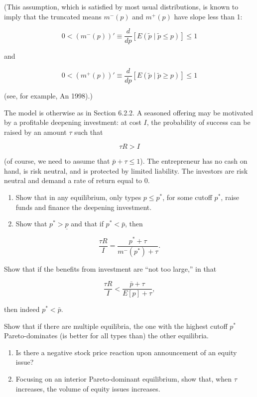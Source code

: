 \documentclass[11pt,a4paper]{article}
\begin{document}
(This assumption, which is satisfied by most usual distributions, is known to imply that the
truncated means \(m^-(p)\) and \(m^+(p)\) have slope less than 1:

\[0 < (m^-(p))' \equiv \frac{d}{dp}[E(\tilde{p} \mid \tilde{p} \leqslant p)] \leqslant 1\]

and

\[0 < (m^+(p))' \equiv \frac{d}{dp}[E(\tilde{p} \mid \tilde{p} \geqslant p)] \leqslant 1\]

(see, for example, An 1998).)

The model is otherwise as in Section 6.2.2. A seasoned offering may be motivated by a profitable
deepening investment: at cost \(I\), the probability of success can be raised by an amount \(\tau\)
such that

\[\tau R > I\]

(of course, we need to assume that \(\bar{p} + \tau \leqslant 1\)). The entrepreneur has no cash on
hand, is risk neutral, and is protected by limited liability. The investors are risk neutral and
demand a rate of return equal to 0.

\begin{enumerate}
\def\labelenumi{(\roman{enumi})}
\item
  Show that in any equilibrium, only types \(p \leqslant p^*\), for some cutoff \(p^*\), raise funds
  and finance the deepening investment.
\item
  Show that \(p^* > \underline{p}\) and that if \(p^* < \bar{p}\), then
\end{enumerate}

\[\frac{\tau R}{I} = \frac{p^* + \tau}{m^-(p^*) + \tau}.\]

Show that if the benefits from investment are ``not too large,'' in that

\[\frac{\tau R}{I} < \frac{\bar{p} + \tau}{E[p] + \tau},\]

then indeed \(p^* < \bar{p}\).

Show that if there are multiple equilibria, the one with the highest cutoff \(p^*\) Pareto-dominates
(is better for all types than) the other equilibria.

\begin{enumerate}
\def\labelenumi{(\roman{enumi})}
\setcounter{enumi}{2}
\item
  Is there a negative stock price reaction upon announcement of an equity issue?
\item
  Focusing on an interior Pareto-dominant equilibrium, show that, when \(\tau\) increases, the
  volume of equity issues increases.
\end{enumerate}
\end{document}
